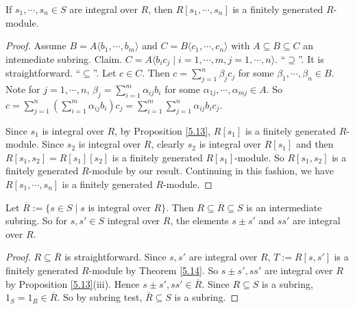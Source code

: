 \begin{theorem}\label{5.14}
    If $s_1,\cdots,s_n \in S$ are integral over $R$, then $R[s_1,\cdots,s_n]$ is a finitely generated $R$-module. 
\end{theorem}

\begin{proof}
    Assume $B = A\langle b_1,\cdots,b_m \rangle$ and $C = B\langle c_1,\cdots,c_n \rangle$ with $A \subseteq B \subseteq C$ an intemediate subring. Claim. $C = A \langle b_ic_j \mid i = 1,\cdots,m, j = 1,\cdots,n\rangle$. ``$\supseteq$''. It is straightforward. ``$\subseteq$''. Let $c \in C$. Then $c = \sum_{j=1}^{n} \beta_jc_j$ for some $\beta_1,\cdots,\beta_n \in B$. Note for $j = 1,\cdots,n$, $\beta_j = \sum_{i=1}^{m} \alpha_{ij}b_i$ for some $\alpha_{1j},\cdots,\alpha_{mj} \in A$. So $c = \sum_{j=1}^{n}(\sum_{i=1}^{m}\alpha_{ij}b_i)c_j = \sum_{i=1}^{m}\sum_{j=1}^{n} \alpha_{ij}b_ic_j$. \par
    Since $s_1$ is integral over $R$, by Proposition \ref{5.13}, $R[s_1]$ is a finitely generated $R$-module. Since $s_2$ is integral over $R$, clearly $s_2$ is integral over $R[s_1]$ and then $R[s_1,s_2] = R[s_1][s_2]$ is a finitely generated $R[s_1]$-module. So $R[s_1,s_2]$ is a finitely generated $R$-module by our result. Continuing in this fashion, we have $R[s_1,\cdots,s_n]$ is a finitely generated $R$-module.
\end{proof}

\begin{theorem}\label{5.15}
    Let $\overbar{R} := \{s \in S \mid s \text{ is integral over }R\}$. Then $R \subseteq \overbar{R} \subseteq S$ is an intermediate subring. So for $s,s' \in S$ integral over $R$, the elements $s \pm s'$ and $ss'$ are integral over $R$.
\end{theorem}

\begin{proof}
    $R \subseteq \overbar{R}$ is straightforward. Since $s,s'$ are integral over $R$, $T := R[s,s']$ is a finitely generated $R$-module by Theorem \ref{5.14}. So $s \pm s',ss'$ are integral over $R$ by Proposition \ref{5.13}(iii). Hence $s \pm s', ss' \in \overbar{R}$. Since $R \subseteq S$ is a subring, $1_S = 1_R \in \overbar{R}$. So by subring test, $\overbar{R} \subseteq S$ is a subring. 
\end{proof}

